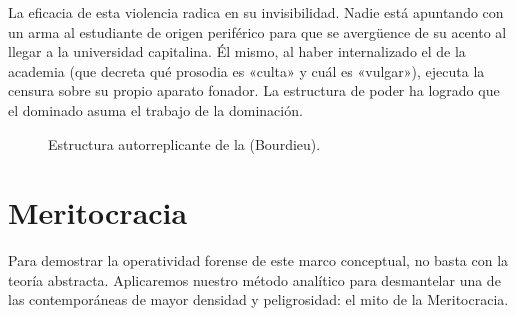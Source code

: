 La eficacia de esta violencia radica en su invisibilidad. Nadie está apuntando con un arma al estudiante de origen periférico para que se avergüence de su acento al llegar a la universidad capitalina. Él mismo, al haber internalizado el \RegimenVerdad{} de la academia (que decreta qué prosodia es «culta» y cuál es «vulgar»), ejecuta la censura sobre su propio aparato fonador. La estructura de poder ha logrado que el dominado asuma el trabajo de la dominación.

\begin{figure}[htbp]
    \centering
    
    \caption{Estructura autorreplicante de la \ViolenciaSimbolica{} (Bourdieu).}
    \label{fig:violencia_simbolica}
\end{figure}

\section{Meritocracia}

Para demostrar la operatividad forense de este marco conceptual, no basta con la teoría abstracta. Aplicaremos nuestro método analítico para desmantelar una de las \FormasSimbolicas{} contemporáneas de mayor densidad y peligrosidad: el mito de la Meritocracia.

